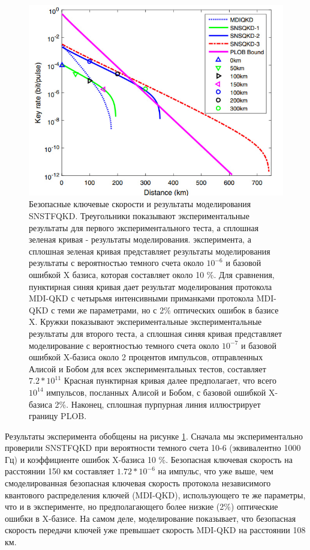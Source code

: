  \begin{figure}
     \centering
     \includegraphics{images/TF key rate lit.jpg}
     \caption{Безопасные ключевые скорости и результаты моделирования SNSTFQKD.
Треугольники показывают экспериментальные результаты для первого экспериментального теста, а сплошная зеленая кривая - результаты моделирования. эксперимента, а сплошная зеленая кривая представляет результаты моделирования
результаты с вероятностью темного счета около $10^{-6}$ и базовой ошибкой X базиса,  которая составляет около 10 \%. Для сравнения, пунктирная синяя кривая дает результат моделирования протокола MDI-QKD с четырьмя интенсивными приманками протокола MDI-QKD с теми же параметрами, но с
2\% оптических ошибок в базисе X. Кружки показывают экспериментальные экспериментальные результаты для второго теста, а сплошная синяя кривая представляет моделирование с вероятностью темного счета около
$10^{-7}$ и базовой ошибкой X-базиса около 2 процентов %
импульсов, отправленных Алисой и Бобом для всех экспериментальных тестов, составляет
$7.2*10^{11}$ Красная пунктирная кривая далее предполагает, что всего $10^{14}$ импульсов, посланных Алисой и Бобом, с базовой ошибкой X-базиса 2\%. Наконец, сплошная пурпурная линия иллюстрирует границу PLOB.}
     \label{fig:TF key rate lit}
 \end{figure}
 Результаты эксперимента обобщены на рисунке \ref{fig:TF key rate lit}. Сначала мы экспериментально проверили SNSTFQKD при вероятности темного счета 10-6 (эквивалентно 1000 Гц) и коэффициенте ошибок X-базиса 10 \%. Безопасная ключевая скорость на расстоянии 150 км составляет $1.72*10^{-6}$  на импульс, что уже выше, чем смоделированная безопасная ключевая скорость протокола независимого квантового распределения ключей (MDI-QKD), использующего те же параметры, что и в эксперименте, но предполагающего более низкие (2\%) оптические ошибки в X-базисе. На самом деле, моделирование показывает, что безопасная скорость передачи ключей уже превышает скорость MDI-QKD на расстоянии 108 км.
